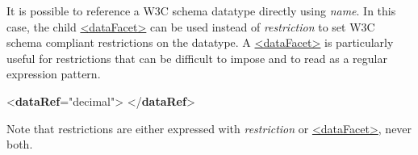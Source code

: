 It is possible to reference a W3C schema datatype directly using {\itshape name}. In this case, the child \hyperref[TEI.dataFacet]{<dataFacet>} can be used instead of {\itshape restriction} to set W3C schema compliant restrictions on the datatype. A \hyperref[TEI.dataFacet]{<dataFacet>} is particularly useful for restrictions that can be difficult to impose and to read as a regular expression pattern. \par\bgroup{}\exampleFont \begin{shaded}\noindent\mbox{}{<\textbf{dataRef}\hspace*{1em}{name}="{decimal}">}\mbox{}\newline 
{}\mbox{}\newline 
{}\mbox{}\newline 
{</\textbf{dataRef}>}\end{shaded}\egroup\par \noindent  Note that restrictions are either expressed with {\itshape restriction} or \hyperref[TEI.dataFacet]{<dataFacet>}, never both.\par
